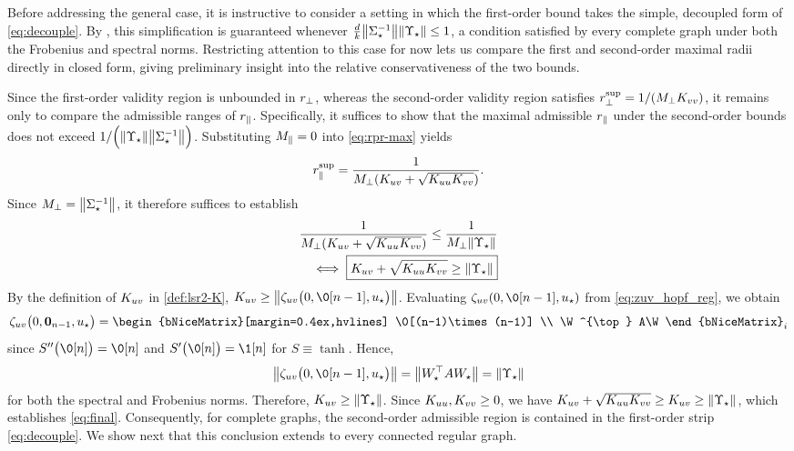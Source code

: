 \documentclass[a4paper]{cas-dc}
\begin{document}
Before addressing the general case, it is instructive to consider a setting in which the first-order bound takes the simple, decoupled form of \eqref{eq:decouple}. By , this simplification is guaranteed whenever \(\tfrac{d}{k}\norm{\Sigma_{\star }^{-1}}\norm{\Upsilon_{\star }} \le 1\), a condition satisfied by every complete graph under both the Frobenius and spectral norms. Restricting attention to this case for now lets us compare the first and second-order maximal radii directly in closed form, giving preliminary insight into the relative conservativeness of the two bounds.

Since the first-order validity region is unbounded in \(r_{\perp}\), whereas the second-order validity region satisfies \(r_{\perp}^{\sup} = 1/(M_{\perp} K_{vv})\), it remains only to compare the admissible ranges of \(r_{\parallel}\). Specifically, it suffices to show that the maximal admissible \(r_{\parallel}\) under the second-order bounds does not exceed \(1/\Bigl(\norm{\Upsilon_{\star }}\norm{\Sigma_{\star }^{-1}}\Bigr)\).
Substituting \(M_{\parallel}=0\) into \eqref{eq:rpr-max} yields
\begin{equation*}
    r_{\parallel}^{\sup} = \frac{1}{M_{\perp}(K_{uv}+\sqrt{K_{uu}K_{vv}})}.
\end{equation*}
Since \(M_{\perp}=\norm{\Sigma_{\star }^{-1}}\), it therefore suffices to establish
\begin{align}
    \frac{1}{M_{\perp}(K_{uv}+\sqrt{K_{uu}K_{vv}})} \le \frac{1}{M_{\perp}\norm{\Upsilon_{\star }}}
    \notag \\ \iff
    \boxed{K_{uv}+\sqrt{K_{uu}K_{vv}} \ge \norm{\Upsilon_{\star }}} \label{eq:final}
\end{align}
By the definition of \(K_{uv}\) in \eqref{def:lsr2-K}, \(\Kuv \ge \norm{\zuv\bigl(0, \0[n-1], u_{\star}\bigr)}\). Evaluating \(\zuv(0, \0[n-1], u_{\star})\) from \eqref{eq:zuv_hopf_reg}, we obtain
\begin{equation*}
    \renewcommand{\arraystretch}{1.25}
    \zuv\bigl(0, \0[n-1], u_{\star}\bigr) = \begin{bNiceMatrix}[margin=0.4ex,hvlines]
        \0[(n-1)\times(n-1)] \\ \W^{\top} A\W
    \end{bNiceMatrix}_{i}
\end{equation*}
since \(S''\bigl(\0[n]\bigr) = \0[n]\) and \(S'\bigl(\0[n]\bigr)=\1[n]\) for \(S \equiv \tanh\). Hence,
\begin{equation*}
    \norm{\zuv\bigl(0, \0[n-1], u_{\star}\bigr)} = \norm{\W^{\top}A\W} = \norm{\U}
\end{equation*}
for both the spectral and Frobenius norms. Therefore, \(K_{uv} \ge \norm{\Upsilon_{\star }}\). Since \(K_{uu}, K_{vv} \ge 0\), we have \(K_{uv} + \sqrt{K_{uu}K_{vv}} \ge K_{uv} \ge \norm{\Upsilon_{\star }}\), which establishes \eqref{eq:final}. Consequently, for complete graphs, the second-order admissible region is contained in the first-order strip \eqref{eq:decouple}. We show next that this conclusion extends to every connected regular graph.
\end{document}
